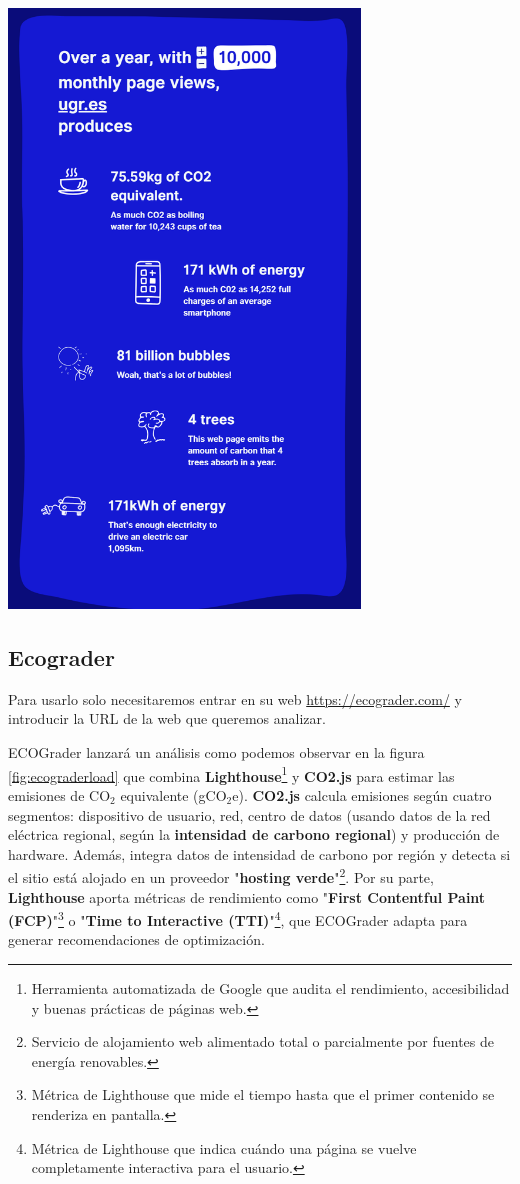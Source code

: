 \documentclass[12pt,a4paper]{report}
\begin{document}
\begin{center}
  \includegraphics[width=0.7\textwidth]{imagenes/WCC_3.png}
  \label{fig:wccanual}
\end{center}

\subsection{Ecograder}
Para usarlo solo necesitaremos entrar en su web \url{https://ecograder.com/} y
introducir la URL de la web que queremos analizar.

ECOGrader lanzará un análisis como podemos observar en la figura \ref{fig:ecograderload} que combina
\textbf{Lighthouse}\footnote{Herramienta automatizada de Google que audita el
  rendimiento, accesibilidad y buenas prácticas de páginas web.} y
\textbf{CO2.js} para estimar las emisiones de CO$_2$ equivalente (gCO$_2$e).
\textbf{CO2.js} calcula emisiones según cuatro segmentos: dispositivo de
usuario, red, centro de datos (usando datos de la red eléctrica regional, según
la \textbf{intensidad de carbono regional}) y producción de hardware. Además, integra datos de
intensidad de carbono por región y detecta si el sitio está alojado en un
proveedor "\textbf{hosting verde}"\footnote{Servicio de alojamiento web
  alimentado total o parcialmente por fuentes de energía renovables.}. Por su
parte, \textbf{Lighthouse} aporta métricas de rendimiento como "\textbf{First
  Contentful Paint (FCP)}"\footnote{Métrica de Lighthouse que mide el tiempo
  hasta que el primer contenido se renderiza en pantalla.} o "\textbf{Time to
  Interactive (TTI)}"\footnote{Métrica de Lighthouse que indica cuándo una página
  se vuelve completamente interactiva para el usuario.}, que ECOGrader adapta
para generar recomendaciones de optimización.
\end{document}
